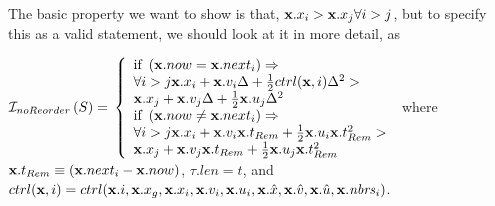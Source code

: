\documentclass[10pt, conference, compsocconf]{IEEEtran}
\begin{document}
%
%
%

\begin{inv}
The basic property we want to show is that, ${\bf x}.x_i > {\bf x}.x_j \forall i > j$, but to specify this as a valid statement, we should look at it in more detail, as

${\cal I}_{noReorder}\left(S\right) = \\
	\left\{ \begin{array}{l}
		\textrm{if } \left( {\bf x}.now = {\bf x}.next_i \right) \Rightarrow \\
		\forall i>j {\bf x}.x_{i} + {\bf x}.v_{i}\Delta + \frac{1}{2}ctrl({\bf x}, i)\Delta^2 > \\ {\bf x}.x_{j} + {\bf x}.v_{j}\Delta + \frac{1}{2}{\bf x}.u_j\Delta^2 \\
		\textrm{if } \left( {\bf x}.now \neq {\bf x}.next_i \right) \Rightarrow \\
		\forall i>j {\bf x}.x_{i} + {\bf x}.v_{i}{\bf x}.t_{Rem} + \frac{1}{2}{\bf x}.u_i{\bf x}.t_{Rem}^2 > \\ {\bf x}.x_{j} + {\bf x}.v_{j}{\bf x}.t_{Rem} + \frac{1}{2}{\bf x}.u_j{\bf x}.t_{Rem}^2 \\
	\end{array}
\right.$
%
where ${\bf x}.t_{Rem} \equiv \left({\bf x}.next_i - {\bf x}.now\right)$, $\tau.len = t$, and $ctrl({\bf x}, i)=ctrl({\bf x}.i, {\bf x}.x_g, {\bf x}.x_i, {\bf x}.v_i, {\bf x}.u_i, {\bf x}.\hat{x}, {\bf x}.\hat{v}, {\bf x}.\hat{u}, {\bf x}.\mathit{nbrs}_i)$.
\end{inv}
\end{document}
